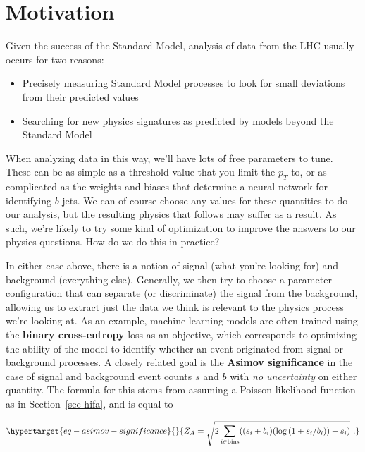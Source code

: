 \documentclass[
  11pt,
  numbers=noendperiod]{book}
\providecommand{\tightlist}{%
  \setlength{\itemsep}{0pt}\setlength{\parskip}{0pt}}\usepackage{longtable,booktabs,array}
\begin{document}
\hypertarget{motivation}{%
\section{Motivation}\label{motivation}}

Given the success of the Standard Model, analysis of data from the LHC
usually occurs for two reasons:

\begin{itemize}
\tightlist
\item
  Precisely measuring Standard Model processes to look for small
  deviations from their predicted values
\item
  Searching for new physics signatures as predicted by models beyond the
  Standard Model
\end{itemize}

When analyzing data in this way, we'll have lots of free parameters to
tune. These can be as simple as a threshold value that you limit the
\(p_T\) to, or as complicated as the weights and biases that determine a
neural network for identifying \(b\)-jets. We can of course choose any
values for these quantities to do our analysis, but the resulting
physics that follows may suffer as a result. As such, we're likely to
try some kind of optimization to improve the answers to our physics
questions. How do we do this in practice?

In either case above, there is a notion of {signal} (what you're looking
for) and {background} (everything else). Generally, we then try to
choose a parameter configuration that can separate (or discriminate) the
signal from the background, allowing us to extract just the data we
think is relevant to the physics process we're looking at. As an
example, machine learning models are often trained using the
\textbf{binary cross-entropy} loss as an objective, which corresponds to
optimizing the ability of the model to identify whether an event
originated from signal or background processes. A closely related goal
is the \textbf{Asimov significance} in the case of signal and background
event counts \(s\) and \(b\) with \emph{no uncertainty} on either
quantity. The formula for this stems from assuming a Poisson likelihood
function as in Section~\ref{sec-hifa}, and is equal to

\begin{equation}\protect\hypertarget{eq-asimov-significance}{}{
Z_A = \sqrt{2\sum_{i\in \mathrm{bins}}((s_i + b_i)(\log{(1 + s_i / b_i)}) - s_i)}~.
}\label{eq-asimov-significance}\end{equation}
\end{document}
